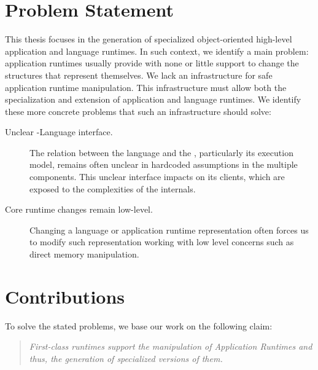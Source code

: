 \section{Problem Statement}

This thesis focuses in the generation of specialized object-oriented high-level application and language runtimes. In such context, we identify a main problem: application runtimes usually provide with none or little support to change the structures that represent themselves. We lack an infrastructure for safe application runtime manipulation. This infrastructure must allow both the specialization and extension of application and language runtimes. We identify these more concrete problems that such an infrastructure should solve:
\begin{description}
\item[Unclear \VM-Language interface.] The relation between the language and the \VM, particularly its execution model, remains often unclear in \VM hardcoded assumptions in the multiple \VM components. This unclear interface impacts on its clients, which are exposed to the complexities of the \VM internals. 

\item[Core runtime changes remain low-level.] Changing a language or application runtime representation often forces us to modify such representation  working with low level concerns such as direct memory manipulation.


\end{description}

\section{Contributions}

To solve the stated problems, we base our work on the following claim: 

\blockquote{\emph{First-class runtimes support the manipulation of Application Runtimes and thus, the generation of specialized versions of them.}}


